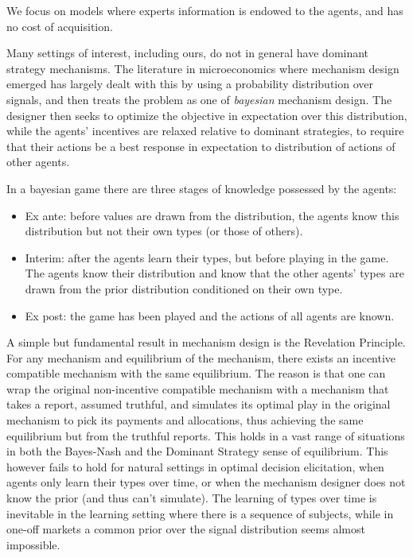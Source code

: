 We focus on models where experts information is endowed to the agents, and has no cost of acquisition.

Many settings of interest, including ours, do not in general have dominant strategy mechanisms. 
The literature in microeconomics where mechanism design emerged has largely dealt with this by using a probability distribution over signals, and then treats the problem as one of \emph{bayesian} mechanism design.
The designer then seeks to optimize the objective in expectation over this distribution, while the agents' incentives are relaxed relative to dominant strategies, to require that their actions be a best response in expectation to distribution of actions of other agents.

In a bayesian game there are three stages of knowledge possessed by the agents:
\begin{itemize}
 \item Ex ante: before values are drawn from the distribution, the agents know this distribution but not their own types (or those of others). 
 \item Interim: after the agents learn their types, but before playing in the game. The agents know their distribution and know that the other agents' types are drawn from the prior distribution conditioned on their own type.
 \item Ex post: the game has been played and the actions of all agents are known.
\end{itemize}

A simple but fundamental result in mechanism design is the Revelation Principle.
For any mechanism and equilibrium of the mechanism, there exists an incentive compatible mechanism with the same equilibrium.
The reason is that one can wrap the original non-incentive compatible mechanism with a mechanism that takes a report, assumed truthful, and simulates its optimal play in the original mechanism to pick its payments and allocations, thus achieving the same equilibrium but from the truthful reports. 
This holds in a vast range of situations in both the Bayes-Nash and the Dominant Strategy sense of equilibrium. 
This however fails to hold for natural settings in optimal decision elicitation, when agents only learn their types over time, or when the mechanism designer does not know the prior (and thus can't simulate).
The learning of types over time is inevitable in the learning setting where there is a sequence of subjects, while in one-off markets a common prior over the signal distribution seems almost impossible.




